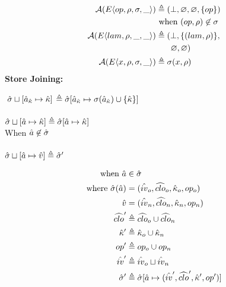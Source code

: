 \documentclass[12pt,draft]{article}
\newcommand{\store}[0]{\sigma}
\newcommand{\E}[4]{E\langle #1 , #2 , #3 , #4 \rangle}
\begin{document}
\begin{multicols*}{2}
\begin{align*}
    \mathcal{A}(\E{op}{\cenv}{\cstore}{\_})
                                &\triangleq (\bot , \varnothing ,
                                  \varnothing , \{op\}) \\
                                &\text{ when } (op , \cenv) \not\in \cstore \\
    \mathcal{A}(\E{lam}{\cenv}{\_}{\_}) &\triangleq (\bot , \{(lam , \cenv)\} , \\
                                & \;\;\;\;\;\:\, \varnothing , \varnothing) \\
    \mathcal{A}(\E{x}{\cenv}{\cstore}{\_}) &\triangleq \cstore(x , \cenv)
  \end{align*}
  \textbf{Store Joining:}
  \begin{center}
    $\; \hat{\sigma} \sqcup [\hat{a}_{\hat{\kappa}} \mapsto \hat{\kappa}]$
    $\triangleq \astore[\akaddr \mapsto \store(\akaddr) \cup \{\akont\}]$ \\
    \; \\
    $\hat{\sigma} \sqcup [\hat{a} \mapsto \hat{\kappa}]
    \triangleq \hat{\sigma}[\hat{a} \mapsto \hat{\kappa}]$ \\
    When $\hat{a} \not\in \hat{\sigma} $ \\
    \; \\
    $\hat{\sigma} \sqcup [\hat{a} \mapsto \hat{v}] \triangleq \hat{\sigma}'$
  \end{center}
  \vspace{-7mm}
  \begin{align*}
    \text {when } \hat{a} &\in \hat{\sigma} \\
    \text{where }
    \hat{\sigma}(\hat{a}) &= (\hat{iv}_o , \widehat{clo}_o , \hat{\kappa}_o , op_o) \\
    \hat{v} &= (\hat{iv}_n , \widehat{clo}_n , \hat{\kappa}_n , op_n) \\
    \widehat{clo}' &\triangleq \widehat{clo}_o \cup \widehat{clo}_n \\
    \hat{\kappa}' &\triangleq \hat{\kappa}_o \cup \hat{\kappa}_n \\
    op' &\triangleq op_o \cup op_n \\
    \hat{iv}' &\triangleq \hat{iv}_o \sqcup \hat{iv}_n \\
    \hat{\sigma}' &\triangleq \hat{\sigma}[\hat{a} \mapsto  (\hat{iv}',\widehat{clo}' , \hat{\kappa}' , op')]
  \end{align*}
\end{multicols*}

\newpage
\end{document}
